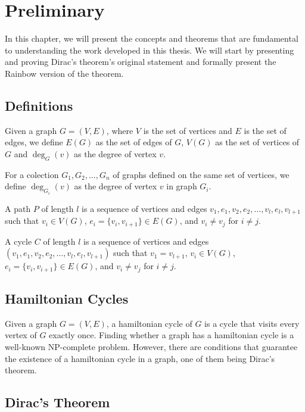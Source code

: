 
\chapter{Preliminary}

In this chapter, we will present the concepts and theorems that are fundamental to understanding the 
work developed in this thesis. We will start by presenting and proving Dirac's theorem's original
statement and formally present the Rainbow version of the theorem.

\section{Definitions}

Given a graph $G = (V, E)$, where $V$ is the set of vertices and $E$ is the set of edges, we define $E(G)$ as
the set of edges of $G$, $V(G)$ as the set of vertices of $G$ and $\deg_G(v)$ as the degree of vertex $v$.

For a colection $G_1, G_2, \ldots, G_n$ of graphs defined on the same set of vertices, we define
$\deg_{G_i}(v)$ as the degree of vertex $v$ in graph $G_i$.

A path $P$ of length $l$ is a sequence of vertices and edges $v_1, e_1, v_2, e_2, \ldots, v_{l}, e_{l}, v_{l + 1}$ such that
$v_i \in V(G)$, $e_i = \{v_i, v_{i + 1}\} \in E(G)$, and $v_i \neq v_j$ for $i \neq j$.

A cycle $C$ of length $l$ is a sequence of vertices and edges $(v_1, e_1, v_2, e_2, \ldots, v_{l}, e_{l}, v_{l + 1})$ such that
$v_{1} = v_{l + 1}$, $v_i \in V(G)$, $e_i = \{v_i, v_{i + 1}\} \in E(G)$, and $v_i \neq v_j$ for $i \neq j$.

\section{Hamiltonian Cycles}

Given a graph $G = (V, E)$, a hamiltonian cycle of $G$ is a cycle that visits every vertex of $G$ exactly once.
Finding whether a graph has a hamiltonian cycle is a well-known NP-complete problem. 
However, there are conditions that guarantee the existence of a hamiltonian cycle in a graph, one of them being Dirac's theorem.

\section{Dirac's Theorem}

